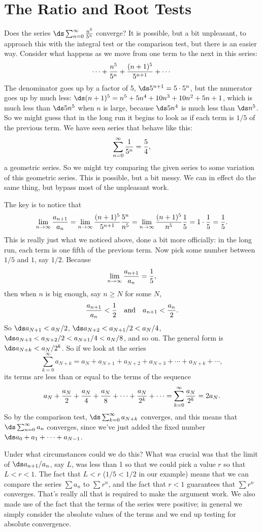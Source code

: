 \section{The Ratio and Root Tests}{}{}
\nobreak
Does the series $\ds\sum_{n=0}^\infty {n^5\over 5^n}$ converge? It is
possible, but a bit unpleasant, to approach this with the integral
test or the comparison test, but there is an easier way. Consider what
happens as we move from one term to the next in this series:
$$\cdots+{n^5\over5^n}+{(n+1)^5\over 5^{n+1}}+\cdots$$
The denominator goes up by a factor of 5, $\ds 5^{n+1}=5\cdot5^n$, but the
numerator goes up by much less: $\ds (n+1)^5=n^5+5n^4+10n^3+10n^2+5n+1$,
which is much less than $\ds 5n^5$ when $n$ is large, because $\ds 5n^4$ is
much less than $\ds n^5$. So we might guess that in the long run it begins
to look as if each term is $1/5$ of the previous term. We have seen
series that behave like this:
$$\sum_{n=0}^\infty {1\over 5^n} = {5\over4},$$
a geometric series. So we might try comparing the given series to some
variation of this geometric series. This is possible, but a bit
messy. We can in effect do the same thing, but bypass most of the
unpleasant work.

The key is to notice that
$$
  \lim_{n\to\infty} {a_{n+1}\over a_n}=
  \lim_{n\to\infty} {(n+1)^5\over 5^{n+1}}{5^n\over n^5}=
  \lim_{n\to\infty} {(n+1)^5\over n^5}{1\over 5}=1\cdot {1\over5}
    ={1\over 5}.
$$ 
This is really just what we noticed above, done a bit more officially:
in the long run, each term is one fifth of the previous term. Now pick
some number between $1/5$ and $1$, say $1/2$. Because
$$\lim_{n\to\infty} {a_{n+1}\over a_n}={1\over5},$$
then when $n$ is big enough, say $n\ge N$ for some $N$, 
$$
  {a_{n+1}\over a_n}<{1\over2} \hbox{\quad and\quad} a_{n+1}<{a_n\over2}.
$$
So $\ds a_{N+1}< a_N/2$, $\ds a_{N+2}<a_{N+1}/2<a_N/4$,
$\ds a_{N+3}<a_{N+2}/2< a_{N+1}/4<a_N/8$, and so on. The general form is
$\ds a_{N+k}< a_N/2^k$. So if we look at the series
$$
  \sum_{k=0}^\infty a_{N+k}=
  a_N+a_{N+1}+a_{N+2}+a_{N+3}+\cdots+a_{N+k}+\cdots,
$$
its terms are less than or equal to the terms of the sequence
$$
  a_N+{a_N\over2}+{a_N\over4}+{a_N\over8}+\cdots+{a_N\over2^k}+\cdots=
  \sum_{k=0}^\infty {a_N\over 2^k} = 2a_N.
$$
So by the comparison test, $\ds\sum_{k=0}^\infty a_{N+k}$ converges,
and this means that $\ds\sum_{n=0}^\infty a_{n}$ converges, since
we've just added the fixed number $\ds a_0+a_1+\cdots+a_{N-1}$.

Under what circumstances could we do this? What was crucial was that
the limit of $\ds a_{n+1}/a_n$, say $L$, was less than 1 so that we could pick a
value $r$ so that $L<r<1$. The fact that $L<r$ ($1/5<1/2$ in our
example) means that we can compare the series $\sum a_n$ to $\sum
r^n$, and the fact that $r<1$ guarantees that $\sum r^n$
converges. That's really all that is required to make the argument
work. We also made use of the fact that the terms of the series were
positive; in general we simply consider the absolute values of the
terms and we end up testing for absolute convergence.

